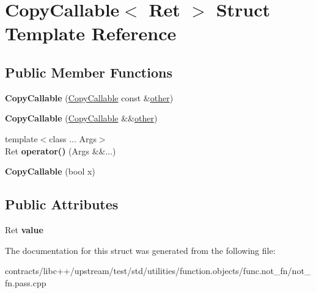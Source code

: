 \hypertarget{struct_copy_callable}{}\section{Copy\+Callable$<$ Ret $>$ Struct Template Reference}
\label{struct_copy_callable}
\subsection*{Public Member Functions}
\begin{DoxyCompactItemize}
\item 
\mbox{\label{struct_copy_callable_a25a306842ba9a293fa7d49d4227077ac}} 
{\bfseries Copy\+Callable} (\mbox{\hyperlink{struct_copy_callable}{Copy\+Callable}} const \&\mbox{\hyperlink{structother}{other}})
\item 
\mbox{\label{struct_copy_callable_a2b69b2547e8ed23b00b4e229d4a30c06}} 
{\bfseries Copy\+Callable} (\mbox{\hyperlink{struct_copy_callable}{Copy\+Callable}} \&\&\mbox{\hyperlink{structother}{other}})
\item 
\mbox{\label{struct_copy_callable_a5bbcffb9cb40580dbbcae784d6fa5e73}} 
{\footnotesize template$<$class ... Args$>$ }\\Ret {\bfseries operator()} (Args \&\&...)
\item 
\mbox{\label{struct_copy_callable_adf5ee4366fc41f0a4b420972a6b009d5}} 
{\bfseries Copy\+Callable} (bool x)
\end{DoxyCompactItemize}
\subsection*{Public Attributes}
\begin{DoxyCompactItemize}
\item 
\mbox{\label{struct_copy_callable_a992ff5e90321bdffa8b8ddd8647b0bbd}} 
Ret {\bfseries value}
\end{DoxyCompactItemize}


The documentation for this struct was generated from the following file\+:\begin{DoxyCompactItemize}
\item 
contracts/libc++/upstream/test/std/utilities/function.\+objects/func.\+not\+\_\+fn/not\+\_\+fn.\+pass.\+cpp\end{DoxyCompactItemize}
